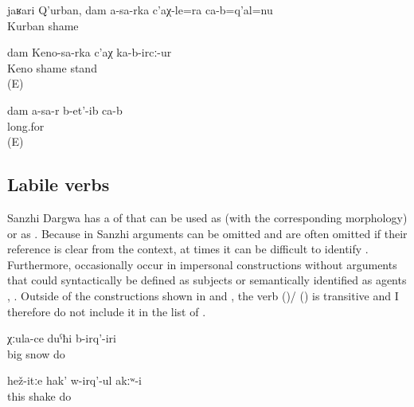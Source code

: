	\begin{exe}	
		\ex	\label{ex:Hey, Kurban, I am ashamed in front of you}
	\gll	jaʁari	Q'urban,	dam	a-sa-rka	c'aχ-le=ra	ca-b=q'al=nu\\
			Kurban			shame	\\
	\glt	{}

	\ex	\label{ex:I got embarrassed in front of Ali}
	\gll	dam	Keno-sa-rka	c'aχ	ka-b-ircː-ur\\
			Keno	shame	stand\\
	\glt	{} (E)
	
	\ex	\label{ex:I miss youValency}
	\gll	dam	a-sa-r	b-et'-ib ca-b\\
				long.for \\
	\glt	{} (E)
\end{exe}




\subsection{Labile verbs}
\label{sec:Labile verbs}

Sanzhi Dargwa has a  of  that can be used as  (with the corresponding morphology) or as . Because in Sanzhi arguments can be omitted and are often omitted if their reference is clear from the context, at times it can be difficult to identify . Furthermore, occasionally  occur in impersonal constructions without arguments that could syntactically be defined as subjects or semantically identified as agents , . Outside of the constructions shown in  and , the verb  ()\slash{} () is transitive and I therefore do not include it in the list of .
%
\begin{exe}
	\ex	\label{ex:It used to snow a lotA}
	\gll	χːula-ce	duˁħi	b-irq'-iri\\
		big	snow	do\\
	\glt	{}

	\ex	\label{ex:He was not shaking like this (i.e. not able to move)}
	\gll	hež-itːe	hak'	w-irq'-ul	akːʷ-i\\
		this	shake	do	\\
	\glt	{}
\end{exe}

